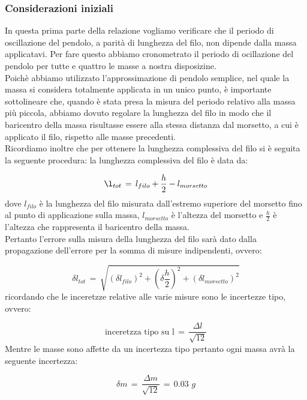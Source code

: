 \subsubsection{Considerazioni iniziali}
In questa prima parte della relazione vogliamo verificare che il periodo di oscillazione del pendolo, a parità di lunghezza del filo, non dipende dalla massa applicatavi.
Per fare questo abbiamo cronometrato il periodo di ocillazione del pendolo per tutte e quattro le masse a nostra disposizine.\\
Poichè abbiamo utilizzato l'approssimazione di pendolo semplice, nel quale la massa si considera totalmente applicata in un unico punto, è importante sottolineare che, quando è stata presa la misura del periodo relativo alla massa più piccola, abbiamo dovuto regolare la lunghezza del filo in modo che il baricentro della massa risultasse essere alla stessa distanza dal morsetto, a cui è applicato il filo, rispetto alle masse precedenti.\\
Ricordiamo inoltre che per ottenere la lunghezza complessiva del filo si è seguita la seguente procedura: la lunghezza complessiva del filo è data da:

\begin{equation}
	\l_{tot} \,=\, l_{filo} + \frac{h}{2} - l_{morsetto}
\end{equation}
%
dove $l _{filo}$ è la lunghezza del filo misurata dall'estremo superiore del morsetto fino al punto di applicazione sulla massa, $l_{morsetto}$ è l'altezza del morsetto e $\frac{h}{2}$ è l'altezza che rappresenta il baricentro della massa.\\
Pertanto l'errore sulla misura della lunghezza del filo sarà dato dalla propagazione dell'errore per la somma di misure indipendenti, ovvero:

\begin{equation}
	\delta l_{tot} \,=\, \sqrt{(\delta l_{filo})^2 + (\delta \frac{h}{2})^2 + (\delta l_{morsetto})^2}
\end{equation}
%
ricordando che le inceretzze relative alle varie misure sono le incertezze tipo, ovvero:

\begin{equation}
	\text{inceretzza tipo su l} \,=\, \frac{\Delta l}{\sqrt{12}}
\end{equation}
%
Mentre le masse sono affette da un incertezza tipo pertanto ogni massa avrà la seguente incertezza:

\begin{equation*}
	\delta m \,=\, \frac{\Delta m}{\sqrt{12}} \,=\, 0.03 \,\, g
\end{equation*}









